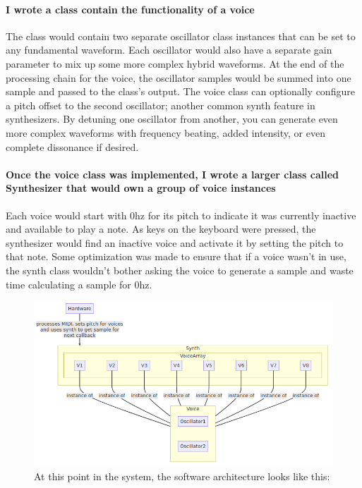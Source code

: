 \documentclass[acmlarge,screen]{acmart}
\begin{document}
	\paragraph{I wrote a class contain the functionality of a voice} The class would contain two separate oscillator class instances that can be set to any fundamental waveform. Each oscillator would also have a separate gain parameter to mix up some more complex hybrid waveforms. At the end of the processing chain for the voice, the oscillator samples would be summed into one sample and passed to the class's output. The voice class can optionally configure a pitch offset to the second oscillator; another common synth feature in synthesizers. By detuning one oscillator from another, you can generate even more complex waveforms with frequency beating, added intensity, or even complete dissonance if desired.

	\paragraph{Once the voice class was implemented, I wrote a larger class called Synthesizer that would own a group of voice instances} Each voice would start with 0hz for its pitch to indicate it was currently inactive and available to play a note. As keys on the keyboard were pressed, the synthesizer would find an inactive voice and activate it by setting the pitch to that note. Some optimization was made to ensure that if a voice wasn't in use, the synth class wouldn't bother asking the voice to generate a sample and waste time calculating a sample for 0hz.
	
	\begin{figure}[H]
		\includegraphics[width=\linewidth]{voice_graph_diagram}
		\caption{At this point in the system, the software architecture looks like this:}
		\centering
	\end{figure}
	
\end{document}
